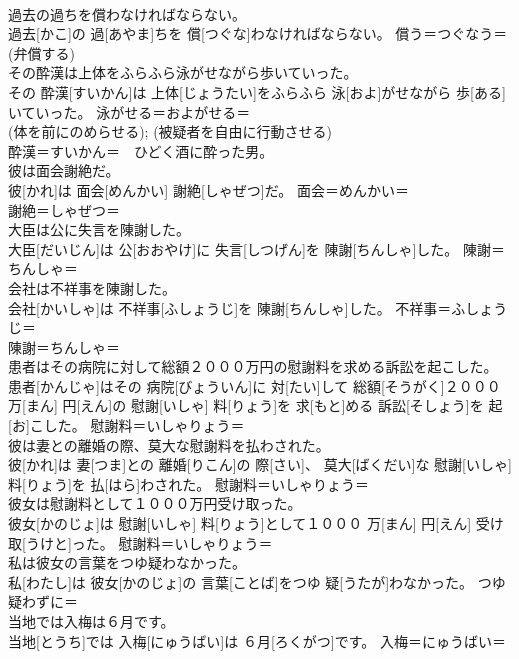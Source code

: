 \documentclass[8pt]{extreport}
\begin{document}
\begin{CJK}{UTF8}{min}
{\\	過去の過ちを償わなければならない。	
\\	過去[かこ]の 過[あやま]ちを 償[つぐな]わなければならない。	償う＝つぐなう＝ 
\\	(弁償する) 
\\	その酔漢は上体をふらふら泳がせながら歩いていった。	
\\	その 酔漢[すいかん]は 上体[じょうたい]をふらふら 泳[およ]がせながら 歩[ある]いていった。	泳がせる＝およがせる＝ 
\\	(体を前にのめらせる); (被疑者を自由に行動させる) 
\\	酔漢＝すいかん＝　ひどく酒に酔った男。
\\	彼は面会謝絶だ。	
\\	彼[かれ]は 面会[めんかい] 謝絶[しゃぜつ]だ。	面会＝めんかい＝ 
\\	謝絶＝しゃぜつ＝ 
\\	大臣は公に失言を陳謝した。	
\\	大臣[だいじん]は 公[おおやけ]に 失言[しつげん]を 陳謝[ちんしゃ]した。	陳謝＝ちんしゃ＝ 
\\	会社は不祥事を陳謝した。	
\\	会社[かいしゃ]は 不祥事[ふしょうじ]を 陳謝[ちんしゃ]した。	不祥事＝ふしょうじ＝ 
\\	陳謝＝ちんしゃ＝ 
\\	患者はその病院に対して総額２０００万円の慰謝料を求める訴訟を起こした。	
\\	患者[かんじゃ]はその 病院[びょういん]に 対[たい]して 総額[そうがく]２０００ 万[まん] 円[えん]の 慰謝[いしゃ] 料[りょう]を 求[もと]める 訴訟[そしょう]を 起[お]こした。	慰謝料＝いしゃりょう＝ 
\\	彼は妻との離婚の際、莫大な慰謝料を払わされた。	
\\	彼[かれ]は 妻[つま]との 離婚[りこん]の 際[さい]、 莫大[ばくだい]な 慰謝[いしゃ] 料[りょう]を 払[はら]わされた。	慰謝料＝いしゃりょう＝ 
\\	彼女は慰謝料として１０００万円受け取った。	
\\	彼女[かのじょ]は 慰謝[いしゃ] 料[りょう]として１０００ 万[まん] 円[えん] 受け取[うけと]った。	慰謝料＝いしゃりょう＝ 
\\	私は彼女の言葉をつゆ疑わなかった。	
\\	私[わたし]は 彼女[かのじょ]の 言葉[ことば]をつゆ 疑[うたが]わなかった。	つゆ疑わずに＝ 
\\	当地では入梅は６月です。	
\\	当地[とうち]では 入梅[にゅうばい]は ６月[ろくがつ]です。	入梅＝にゅうばい＝ 
}
\end{CJK}
\end{document}
